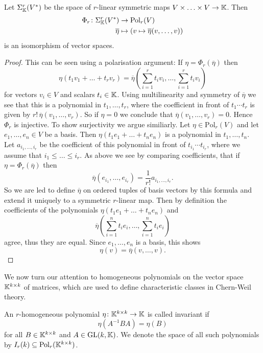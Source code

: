 \begin{lemma}
    Let $\Sigma^r_{\mathbb{K}}(V^\ast)$ be the space of $r$-linear symmetric maps $V \times \ldots \times V \to \mathbb{K}$. Then 
\begin{align*}
\Phi_r \colon \Sigma^r_{\mathbb{K}}(V^\ast) &\to \mathrm{Pol}_r(V) \\
    \overline{\eta} &\mapsto (v \mapsto \overline{\eta}(v,\ldots,v))
\end{align*}
is an isomorphism of vector spaces.
\end{lemma} 
\begin{proof}
    This can be seen using a polarisation argument: If $\eta = \Phi_r(\overline{\eta})$ then 
\[
\eta(t_1v_1 + \ldots + t_rv_r) = \overline{\eta}\left(\sum_{i=1}^{r} t_iv_i,\ldots,\sum_{i=1}^{r} t_iv_i\right)
\]
for vectors $v_i \in V$ and scalars $t_i \in \mathbb{K}$. Using multilinearity and symmetry of $\overline{\eta}$ we see that this is a polynomial in $t_1,\ldots,t_r$, where the coefficient in front of $t_1\cdots t_r$ is given by $r! \, \overline{\eta}(v_1,\ldots,v_r)$. So if $\eta = 0$ we conclude that $\overline{\eta}(v_1,\ldots,v_r) = 0$. Hence $\Phi_r$ is injective. To show surjectivity we argue similiarly. Let $\eta \in \mathrm{Pol}_r(V)$ and let $e_1,\ldots,e_n \in V$ be a basis. Then $\eta(t_1e_1 + \ldots + t_ne_n)$ is a polynomial in $t_1,\ldots,t_n$. Let $a_{i_1,\ldots,i_r}$ be the coefficient of this polynomial in front of $t_{i_1}\cdots t_{i_r}$, where we assume that $i_1 \leq \ldots \leq i_r.$ As above we see by comparing coefficients, that if $\eta = \Phi_r(\overline{\eta})$ then
\[
\overline{\eta}(e_{i_1},\ldots,e_{i_r}) = \frac{1}{r!} a_{i_1,\ldots,i_r}.
\]  
So we are led to define $\overline{\eta}$ on ordered tuples of basis vectors by this formula and extend it uniquely to a symmetric $r$-linear map. Then by definition the coefficients of the polynomials $\eta(t_1e_1 + \ldots + t_ne_n)$ and 
\[
\overline{\eta}\left(\sum_{i=1}^{n} t_ie_i,\ldots,\sum_{i=1}^{n} t_ie_i\right)
\]
agree, thus they are equal. Since $e_1,\ldots,e_n$ is a basis, this shows 
\[
\eta(v) = \overline{\eta}(v,\ldots,v).
\]
\end{proof}

We now turn our attention to homogeneous polynomials on the vector space $\mathbb{K}^{k\times k}$ of matrices, which are used to define characteristic classes in Chern-Weil theory. 

\begin{definition}
    An $r$-homogeneous polynomial $\eta \colon \mathbb{K}^{k \times k} \to \mathbb{K}$ is called invariant if $$\eta(A^{-1}BA) = \eta (B)$$ for all $B \in \mathbb{K}^{k\times k}$ and $A \in \mathrm{GL}(k,\mathbb{K})$. We denote the space of all such polynomials by $I_r(k) \subseteq \mathrm{Pol}_r(\mathbb{K}^{k \times k})$.
\end{definition}

